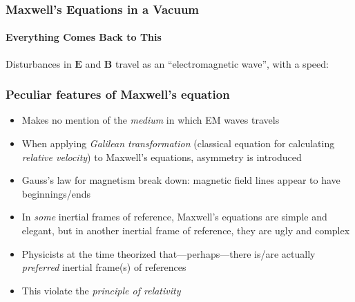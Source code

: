 \documentclass[12pt,compress,aspectratio=169]{beamer}
\newcommand{\mb}[1]{\mathbf{#1}}
\begin{document}
\begin{frame}
  \frametitle{Maxwell's Equations in a Vacuum}
  \framesubtitle{Everything Comes Back to This}

  \vspace{-.3in}{\Large
    \begin{align*}
      \nabla\cdot\mb{E} &= 0\\
      \nabla\cdot\mb{B} &= 0\\
      \nabla\times\mb{E} &=-\frac{\partial\mb{B}}{\partial t}\\
      \nabla\times\mb{B} &=\mu_0\varepsilon_0\frac{\partial\mb{E}}{\partial t}
    \end{align*}
  }
  
  \vspace{-.15in}Disturbances in $\mb{E}$ and $\mb{B}$ travel as an
  ``electromagnetic wave'', with a speed:

\end{frame}


\begin{frame}
  \frametitle{Peculiar features of Maxwell's equation}
  \begin{itemize}
  \item Makes no mention of the \emph{medium} in which EM waves travels
  \item When applying \emph{Galilean transformation} (classical equation for
    calculating \emph{relative velocity}) to Maxwell's equations, asymmetry is
    introduced
  \item Gauss's law for magnetism break down: magnetic field lines appear to
    have beginnings/ends
  \item In \emph{some} inertial frames of reference,
    Maxwell's equations are simple and elegant, but in another inertial frame
    of reference, they are ugly and complex
  \item Physicists at the time theorized that---perhaps---there is/are actually
    \emph{preferred} inertial frame(s) of references
  \item This violate the \emph{principle of relativity}
  \end{itemize}
\end{frame}
\end{document}
